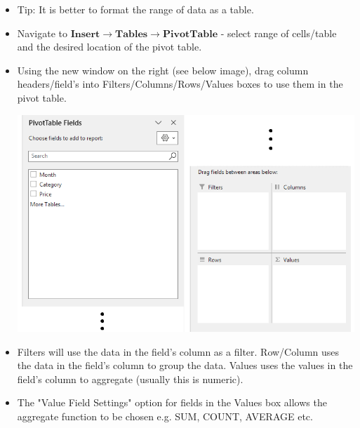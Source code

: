 \documentclass[8pt]{extarticle}
\begin{document}
\begin{multicols}{3}
\begin{itemize}
    \item Tip: It is better to format the range of data as a table.
    \item Navigate to $\textbf{Insert} \rightarrow \textbf{Tables} \rightarrow \textbf{PivotTable}$ - select range of cells/table and the desired location of the pivot table.
    \item Using the new window on the right (see below image), drag column headers/field's into Filters/Columns/Rows/Values boxes to use them in the pivot table.
    \begin{center}
        \includegraphics[width=0.95\columnwidth]{images/pivottable-menu.png}
    \end{center}
    \item Filters will use the data in the field's column as a filter. Row/Column uses the data in the field's column to group the data. Values uses the values in the field's column to aggregate (usually this is numeric).
    \item The "Value Field Settings" option for fields in the Values box allows the aggregate function to be chosen e.g. SUM, COUNT, AVERAGE etc.
\end{itemize}


\end{multicols}
\end{document}

